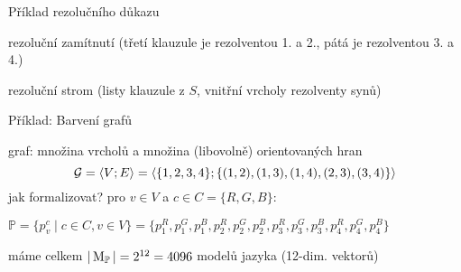 \documentclass{beamer}
\begin{document}
\begin{frame}{Příklad rezolučního důkazu}

\alert{rezoluční zamítnutí} (třetí klauzule je rezolventou 1. a 2., pátá je rezolventou 3. a 4.)


\alert{rezoluční strom} (listy klauzule z $S$, vnitřní vrcholy rezolventy synů) 
\end{frame}





\begin{frame}{Příklad: Barvení grafů}


    
    graf: množina vrcholů a množina (libovolně) \alert{orientovaných} hran
    \[
    \mathcal{G} = \langle V; E \rangle = \langle \{1,2,3,4\}; \{(1,2),(1,3),(1,4),(2,3),(3,4)\} \rangle
    \]
    jak formalizovat? pro $v\in V$ a $c\in C=\{R,G,B\}$:

    \mbox{\small $\mathbb P=\{p_v^c\mid c\in C,v\in V\}=\{p_1^R,p_1^G,p_1^B,p_2^R,p_2^G,p_2^B,p_3^R,p_3^G,p_3^B,p_4^R,p_4^G,p_4^B\}$}

máme celkem \( |\operatorname{M}_\mathbb P|=2^{12}=4096 \) \alert{modelů jazyka} (12-dim. vektorů)
\end{frame}
\end{document}
